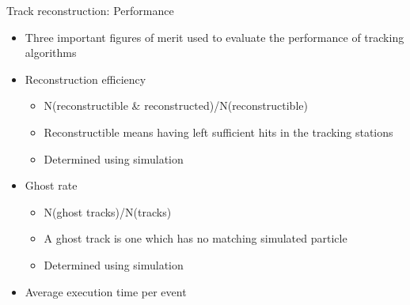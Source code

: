 \documentclass[aspectratio=1610]{beamer}
\begin{document}
\begin{frame}{Track reconstruction: Performance}

\begin{itemize}
  \item Three important figures of merit used to evaluate the performance of tracking algorithms
\end{itemize}
\begin{itemize}
  \item[\ding{182}] Reconstruction efficiency
  \begin{itemize}
    \item[\ding{70}] N(reconstructible \& reconstructed)/N(reconstructible)
    \item[\ding{70}] Reconstructible means having left sufficient hits in the tracking stations
    \item[\ding{70}] Determined using simulation
  \end{itemize}
\end{itemize}
\begin{itemize}
  \item[\ding{183}] Ghost rate
  \begin{itemize}
  \item[\ding{70}] N(ghost tracks)/N(tracks)
  \item[\ding{70}] A ghost track is one which has no matching simulated particle
  \item[\ding{70}] Determined using simulation
  \end{itemize}
\end{itemize}
\begin{itemize}
  \item[\ding{184}] Average execution time per event
\end{itemize}

\end{frame}
\end{document}
